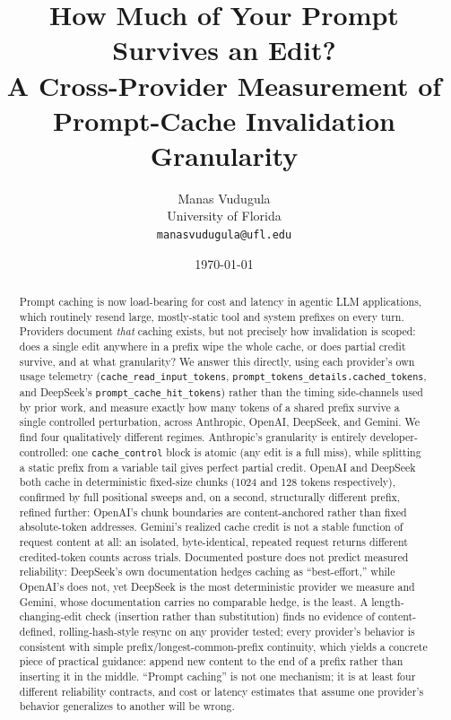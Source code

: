 \documentclass[11pt]{article}
\title{How Much of Your Prompt Survives an Edit?\\
A Cross-Provider Measurement of Prompt-Cache Invalidation Granularity}
\author{Manas Vudugula\\
University of Florida\\
\texttt{manasvudugula@ufl.edu}}
\date{\today}
\newcommand{\code}[1]{\texttt{#1}}
\begin{document}
\maketitle

\begin{abstract}
Prompt caching is now load-bearing for cost and latency in agentic LLM
applications, which routinely resend large, mostly-static tool and system
prefixes on every turn. Providers document \emph{that} caching exists, but
not precisely how invalidation is scoped: does a single edit anywhere in a
prefix wipe the whole cache, or does partial credit survive, and at what
granularity? We answer this directly, using each provider's own usage
telemetry (\code{cache\_read\_input\_tokens},
\code{prompt\_tokens\_details.\allowbreak cached\_tokens}, and DeepSeek's
\code{prompt\_cache\_hit\_tokens}) rather
than the timing side-channels used by prior work, and measure exactly how
many tokens of a shared prefix survive a single controlled perturbation,
across Anthropic, OpenAI, DeepSeek, and Gemini. We find four qualitatively
different regimes. Anthropic's granularity is entirely developer-controlled:
one \code{cache\_control} block is atomic (any edit is a full miss), while
splitting a static prefix from a variable tail gives perfect partial credit.
OpenAI and DeepSeek both cache in deterministic fixed-size chunks (1024 and
128 tokens respectively), confirmed by full positional sweeps and, on a
second, structurally different prefix, refined further: OpenAI's chunk
boundaries are content-anchored rather than fixed absolute-token addresses.
Gemini's realized cache credit is not a stable function of request content
at all: an isolated, byte-identical, repeated request returns different
credited-token counts across trials. Documented posture does not predict
measured reliability: DeepSeek's own documentation hedges caching as
``best-effort,'' while OpenAI's does not, yet DeepSeek is the most
deterministic provider we measure and Gemini, whose documentation carries no
comparable hedge, is the least. A length-changing-edit check (insertion
rather than substitution) finds no evidence of content-defined,
rolling-hash-style resync on any provider tested; every provider's behavior
is consistent with simple prefix/longest-common-prefix continuity, which
yields a concrete piece of practical guidance: append new content to the end
of a prefix rather than inserting it in the middle. ``Prompt caching'' is not
one mechanism; it is at least four different reliability contracts, and
cost or latency estimates that assume one provider's behavior generalizes to
another will be wrong.
\end{abstract}
\end{document}
